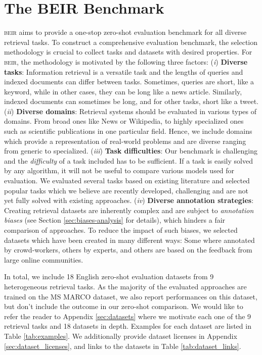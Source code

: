 \documentclass{article}
\newcommand{\custo}[1]{\textsc{\normalsize #1}}
\newcommand{\beir}{\custo{beir}\xspace}
\begin{document}
\section{The BEIR Benchmark} \label{sec_beir_benchmark}
\vspace{-2mm}

\beir aims to provide a one-stop zero-shot evaluation benchmark for all diverse retrieval tasks. To construct a comprehensive evaluation benchmark, the selection methodology is crucial to collect tasks and datasets with desired properties. For \beir, the methodology is motivated by the following three factors: (\emph{i}) \textbf{Diverse tasks}: Information retrieval is a versatile task and the lengths of queries and indexed documents can differ between tasks. Sometimes, queries are short, like a keyword, while in other cases, they can be long like a news article. Similarly, indexed documents can sometimes be long, and for other tasks, short like a tweet. (\emph{ii}) \textbf{Diverse domains}: Retrieval systems should be evaluated in various types of domains. From broad ones like News or Wikipedia, to highly specialized ones such as scientific publications in one particular field. Hence, we include domains which provide a representation of real-world problems and are diverse ranging from generic to specialized. (\emph{iii}) \textbf{Task difficulties}: Our benchmark is challenging and the \textit{difficulty} of a task included has to be sufficient. If a task is easily solved by any algorithm, it will not be useful to compare various models used for evaluation. We evaluated several tasks based on existing literature and selected popular tasks which we believe are recently developed, challenging and are not yet fully solved with existing approaches. (\emph{iv}) \textbf{Diverse annotation strategies}: Creating retrieval datasets are inherently complex and are subject to \textit{annotation biases} (see Section \ref{sec:biases-analysis} for details), which hinders a fair comparison of approaches. To reduce the impact of such biases, we selected datasets which have been created in many different ways: Some where annotated by crowd-workers, others by experts, and others are based on the feedback from large online communities.  

In total, we include 18 English zero-shot evaluation datasets from 9 heterogeneous retrieval tasks. As the majority of the evaluated approaches are trained on the MS MARCO \cite{nguyen2016ms} dataset, we also report performances on this dataset, but don't include the outcome in our zero-shot comparison. We would like to refer the reader to Appendix \ref{sec:datasets} where we motivate each one of the 9 retrieval tasks and 18 datasets in depth. Examples for each dataset are listed in Table \ref{tab:examples}. We additionally provide dataset licenses in Appendix \ref{sec:dataset_licenses}, and links to the datasets in Table \ref{tab:dataset_links}.
\end{document}
